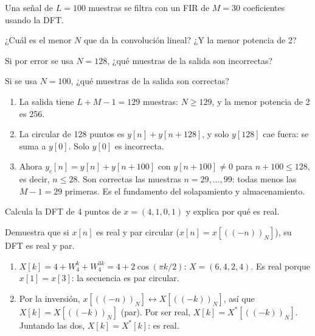 \documentclass[11pt,a4paper]{scrartcl}
\begin{document}
\begin{ejercicio}
  Una señal de $L=100$ muestras se filtra con un FIR de $M=30$ coeficientes usando la DFT.
  \begin{incisos}[1]
    \item ¿Cuál es el menor $N$ que da la convolución lineal? ¿Y la menor potencia de 2?
    \item Si por error se usa $N=128$, ¿qué muestras de la salida son incorrectas?
    \item Si se usa $N=100$, ¿qué muestras de la salida son correctas?
  \end{incisos}
\end{ejercicio}
\begin{solucion}
  \begin{enumerate}[label=\alph*)]
    \item La salida tiene $L+M-1=129$ muestras: $N\ge129$, y la menor potencia de 2 es 256.
    \item La circular de 128 puntos es $y[n]+y[n+128]$, y solo $y[128]$ cae fuera: se suma a $y[0]$. Solo $y[0]$ es incorrecta.
    \item Ahora $y_c[n]=y[n]+y[n+100]$ con $y[n+100]\ne0$ para $n+100\le128$, es decir, $n\le28$. Son correctas las muestras $n=29,\dots,99$: todas menos las $M-1=29$ primeras. Es el fundamento del solapamiento y almacenamiento.
  \end{enumerate}
\end{solucion}

\begin{ejercicio}
  \begin{incisos}[1]
    \item Calcula la DFT de 4 puntos de $x=(4,1,0,1)$ y explica por qué es real.
    \item Demuestra que si $x[n]$ es real y par circular ($x[n]=x[((-n))_N]$), su DFT es real y par.
  \end{incisos}
\end{ejercicio}
\begin{solucion}
  \begin{enumerate}[label=\alph*)]
    \item $X[k]=4+W_4^k+W_4^{3k}=4+2\cos(\pi k/2)$: $X=(6,4,2,4)$. Es real porque $x[1]=x[3]$: la secuencia es par circular.
    \item Por la inversión, $x[((-n))_N]\leftrightarrow X[((-k))_N]$, así que $X[k]=X[((-k))_N]$ (par). Por ser real, $X[k]=X^*[((-k))_N]$. Juntando las dos, $X[k]=X^*[k]$: es real.
  \end{enumerate}
\end{solucion}
\end{document}
